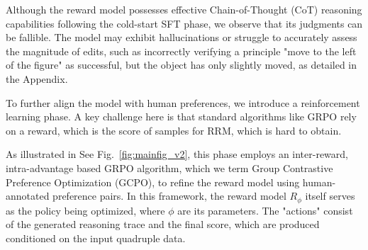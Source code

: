 Although the reward model possesses effective Chain-of-Thought (CoT) reasoning capabilities following the cold-start SFT phase, we observe that its judgments can be fallible. The model may exhibit hallucinations or struggle to accurately assess the magnitude of edits, such as incorrectly verifying a principle "move to the left of the figure" as successful, but the object has only slightly moved, as detailed in the Appendix. 

To further align the model with human preferences, we introduce a reinforcement learning phase. 
A key challenge here is that standard algorithms like GRPO rely on a reward, which is the score of samples for RRM, which is hard to obtain.




As illustrated in See Fig.~\ref{fig:mainfig_v2}, this phase employs an inter-reward, intra-advantage based GRPO algorithm, which we term Group Contrastive Preference Optimization (GCPO), to refine the reward model using human-annotated preference pairs. In this framework, the reward model $R_\phi$ itself serves as the policy being optimized, where $\phi$ are its parameters. The "actions" consist of the generated reasoning trace and the final score, which are produced conditioned on the input quadruple data.

\vspace{-.5em}
